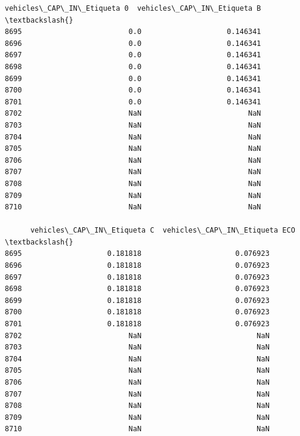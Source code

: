 \documentclass[11pt]{article}
\begin{document}
\begin{tcolorbox}[breakable, size=fbox, boxrule=.5pt, pad at break*=1mm, opacityfill=0]
\begin{Verbatim}[commandchars=\\\{\}]
      vehicles\_CAP\_IN\_Etiqueta 0  vehicles\_CAP\_IN\_Etiqueta B  \textbackslash{}
8695                         0.0                    0.146341
8696                         0.0                    0.146341
8697                         0.0                    0.146341
8698                         0.0                    0.146341
8699                         0.0                    0.146341
8700                         0.0                    0.146341
8701                         0.0                    0.146341
8702                         NaN                         NaN
8703                         NaN                         NaN
8704                         NaN                         NaN
8705                         NaN                         NaN
8706                         NaN                         NaN
8707                         NaN                         NaN
8708                         NaN                         NaN
8709                         NaN                         NaN
8710                         NaN                         NaN

      vehicles\_CAP\_IN\_Etiqueta C  vehicles\_CAP\_IN\_Etiqueta ECO  \textbackslash{}
8695                    0.181818                      0.076923
8696                    0.181818                      0.076923
8697                    0.181818                      0.076923
8698                    0.181818                      0.076923
8699                    0.181818                      0.076923
8700                    0.181818                      0.076923
8701                    0.181818                      0.076923
8702                         NaN                           NaN
8703                         NaN                           NaN
8704                         NaN                           NaN
8705                         NaN                           NaN
8706                         NaN                           NaN
8707                         NaN                           NaN
8708                         NaN                           NaN
8709                         NaN                           NaN
8710                         NaN                           NaN


\end{Verbatim}
\end{tcolorbox}
\end{document}
